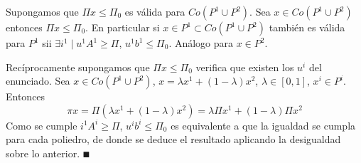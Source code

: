 \documentclass[MIOP.tex]{subfiles}
\begin{document}
\begin{dem}
Supongamos que $\Pi x \leq \Pi_0$ es válida para $ Co(P^1\cup P^2)$. Sea $x \in Co(P^1\cup P^2)$ entonces $\Pi x \leq \Pi_0$. En particular si $x\in P^1 \subset Co(P^1\cup P^2)$ también es válida para $P^1$ sii $\exists i^1\mid u^1 A^1 \geq \Pi$, $u^1 b^1 \leq \Pi_0$. Análogo para $x\in P^2$.

Recíprocamente supongamos que $\Pi x \leq \Pi_0$ verifica que existen los $u^i$ del enunciado. Sea $x\in Co(P^1\cup P^2)$, $x=\lambda x^1 +(1-\lambda)x^2$, $\lambda \in [0,1]$, $x^i\in P^i$. Entonces 
$$
\pi x = \Pi (\lambda x^1 +(1-\lambda)x^2) = \lambda \Pi x^1 +(1-\lambda)\Pi x^2
$$
Como se cumple $i^1 A^i \geq \Pi$, $u^i b^i \leq \Pi_0$ es equivalente a que la igualdad se cumpla para cada poliedro, de donde se deduce el resultado aplicando la desigualdad sobre lo anterior. $\QED$
\end{dem}
\end{document}
